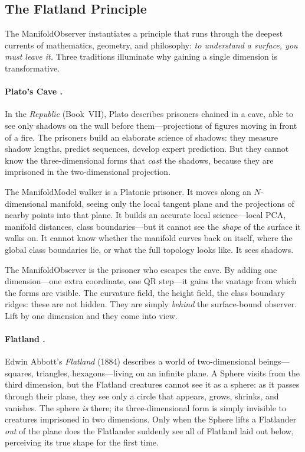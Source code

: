 \documentclass[12pt,letterpaper]{article}
\begin{document}
\subsection{The Flatland Principle}

The ManifoldObserver instantiates a principle that runs through the deepest
currents of mathematics, geometry, and philosophy:
\emph{to understand a surface, you must leave it.}
Three traditions illuminate why gaining a single dimension is transformative.

\paragraph{Plato's Cave \cite{plato}.}
In the \emph{Republic} (Book~VII), Plato describes prisoners chained in a cave,
able to see only shadows on the wall before them---projections of figures moving
in front of a fire.  The prisoners build an elaborate science of shadows: they
measure shadow lengths, predict sequences, develop expert prediction.  But they
cannot know the three-dimensional forms that \emph{cast} the shadows, because
they are imprisoned in the two-dimensional projection.

The ManifoldModel walker is a Platonic prisoner.  It moves along an
$N$-dimensional manifold, seeing only the local tangent plane and the projections
of nearby points into that plane.  It builds an accurate local science---local
PCA, manifold distances, class boundaries---but it cannot see the \emph{shape}
of the surface it walks on.  It cannot know whether the manifold curves back on
itself, where the global class boundaries lie, or what the full topology looks
like.  It sees shadows.

The ManifoldObserver is the prisoner who escapes the cave.  By adding one
dimension---one extra coordinate, one QR step---it gains the vantage from which
the forms are visible.  The curvature field, the height field, the class boundary
ridges: these are not hidden.  They are simply \emph{behind} the surface-bound
observer.  Lift by one dimension and they come into view.

\paragraph{Flatland \cite{abbott84}.}
Edwin Abbott's \emph{Flatland} (1884) describes a world of two-dimensional
beings---squares, triangles, hexagons---living on an infinite plane.  A Sphere
visits from the third dimension, but the Flatland creatures cannot see it as a
sphere: as it passes through their plane, they see only a circle that appears,
grows, shrinks, and vanishes.  The sphere \emph{is} there; its three-dimensional
form is simply invisible to creatures imprisoned in two dimensions.  Only when
the Sphere lifts a Flatlander \emph{out} of the plane does the Flatlander
suddenly see all of Flatland laid out below, perceiving its true shape for the
first time.
\end{document}
